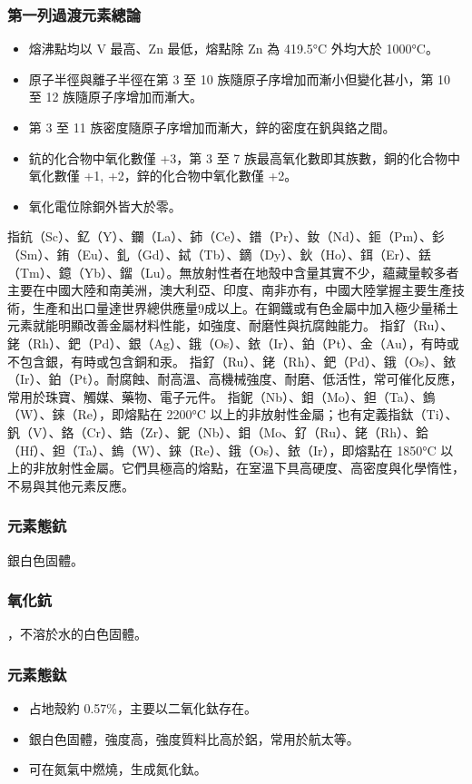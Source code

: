 \documentclass[a4paper,12pt]{report}
\begin{document}
\begin{itemize}
\begin{itemize}
\subsubsection{第一列過渡元素總論}
\begin{itemize}
\item 熔沸點均以 V 最高、Zn 最低，熔點除 Zn 為 419.5°C 外均大於 1000°C。
\item 原子半徑與離子半徑在第 3 至 10 族隨原子序增加而漸小但變化甚小，第 10 至 12 族隨原子序增加而漸大。
\item 第 3 至 11 族密度隨原子序增加而漸大，鋅的密度在釩與鉻之間。
\item 鈧的化合物中氧化數僅 +3，第 3 至 7 族最高氧化數即其族數，銅的化合物中氧化數僅 +1, +2，鋅的化合物中氧化數僅 +2。
\item 氧化電位除銅外皆大於零。
\end{itemize}
指鈧（Sc）、釔（Y）、鑭（La）、鈰（Ce）、鐠（Pr）、釹（Nd）、鉕（Pm）、釤（Sm）、銪（Eu）、釓（Gd）、鋱（Tb）、鏑（Dy）、鈥（Ho）、鉺（Er）、銩（Tm）、鐿（Yb）、鎦（Lu）。無放射性者在地殼中含量其實不少，蘊藏量較多者主要在中國大陸和南美洲，澳大利亞、印度、南非亦有，中國大陸掌握主要生產技術，生產和出口量達世界總供應量9成以上。在鋼鐵或有色金屬中加入極少量稀土元素就能明顯改善金屬材料性能，如強度、耐磨性與抗腐蝕能力。
指釕（Ru）、銠（Rh）、鈀（Pd）、銀（Ag）、鋨（Os）、銥（Ir）、鉑（Pt）、金（Au），有時或不包含銀，有時或包含銅和汞。
指釕（Ru）、銠（Rh）、鈀（Pd）、鋨（Os）、銥（Ir）、鉑（Pt）。耐腐蝕、耐高溫、高機械強度、耐磨、低活性，常可催化反應，常用於珠寶、觸媒、藥物、電子元件。
指鈮（Nb）、鉬（Mo）、鉭（Ta）、鎢（W）、錸（Re），即熔點在 2200°C 以上的非放射性金屬；也有定義指鈦（Ti）、釩（V）、鉻（Cr）、鋯（Zr）、鈮（Nb）、鉬（Mo、釕（Ru）、銠（Rh）、鉿（Hf）、鉭（Ta）、鎢（W）、錸（Re）、鋨（Os）、銥（Ir），即熔點在 1850°C 以上的非放射性金屬。它們具極高的熔點，在室溫下具高硬度、高密度與化學惰性，不易與其他元素反應。
\subsubsection{元素態鈧}
銀白色固體。
\subsubsection{氧化鈧}
，不溶於水的白色固體。
\subsubsection{元素態鈦}
\begin{itemize}
\item 占地殼約 0.57\%，主要以二氧化鈦存在。
\item 銀白色固體，強度高，強度質料比高於鋁，常用於航太等。
\item 可在氮氣中燃燒，生成氮化鈦。
\end{itemize}

\end{itemize}
\end{itemize}
\end{document}

